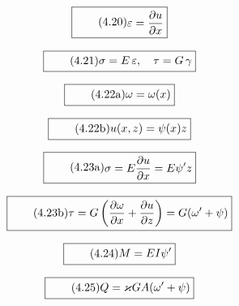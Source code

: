 \documentclass[11pt]{article}
\newcommand{\1}{ {\mathds{1}} }
\renewcommand{\epsilon}{\varepsilon}
\begin{document}
		\begin{equation}
			\boxed{
				\tag{4.20}
				\begin{split}
					\epsilon = \frac{\partial u}{\partial x}
				\end{split}
			}
		\end{equation}

		\begin{equation}
			\boxed{
				\tag{4.21}
				\begin{split}
					\sigma= E\,\epsilon, \quad \tau = G\,\gamma
				\end{split}
			}
		\end{equation}

		\begin{equation}
			\boxed{
				\tag{4.22a}
				\begin{split}
					\omega = \omega(x)
				\end{split}
			}
		\end{equation}

		\begin{equation}
			\boxed{
				\tag{4.22b}
				\begin{split}
					u(x,z) = \psi(x)z
				\end{split}
			}
		\end{equation}
		
		\begin{equation}
			\boxed{
				\tag{4.23a}
				\begin{split}
					\sigma = E\frac{\partial u}{\partial x} = E \psi' z
				\end{split}
			}
		\end{equation}

		\begin{equation}
			\boxed{
				\tag{4.23b}
				\begin{split}
					\tau = G\left( \frac{\partial \omega}{\partial x} + \frac{\partial u}{\partial z} \right) = G (\omega' + \psi)
				\end{split}
			}
		\end{equation}

		\begin{equation}
			\boxed{
				\tag{4.24}
				\begin{split}
					M = E I \psi'
				\end{split}
			}
		\end{equation}

		\begin{equation}
			\boxed{
				\tag{4.25}
				\begin{split}
					Q = \varkappa GA(\omega' +\psi)
				\end{split}
			}
		\end{equation}
		
\end{document}
